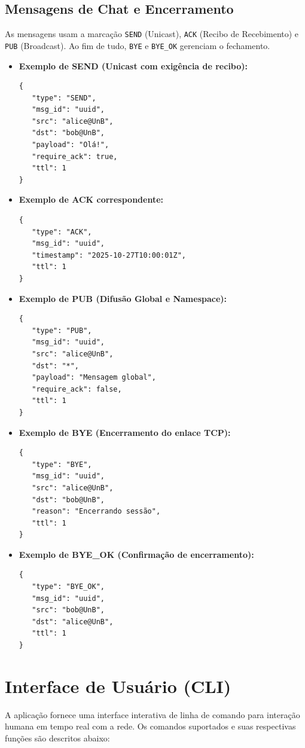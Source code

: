 \documentclass[12pt,a4paper]{article}
\begin{document}
\subsection{Mensagens de Chat e Encerramento}
As mensagens usam a marcação \texttt{SEND} (Unicast), \texttt{ACK} (Recibo de Recebimento) e \texttt{PUB} (Broadcast). Ao fim de tudo, \texttt{BYE} e \texttt{BYE\_OK} gerenciam o fechamento.
\begin{itemize}
    \item \textbf{Exemplo de SEND (Unicast com exigência de recibo):}
\begin{lstlisting}[numbers=none]
{
   "type": "SEND",
   "msg_id": "uuid",
   "src": "alice@UnB",
   "dst": "bob@UnB",
   "payload": "Olá!",
   "require_ack": true,
   "ttl": 1
}
\end{lstlisting}
    \item \textbf{Exemplo de ACK correspondente:}
\begin{lstlisting}[numbers=none]
{
   "type": "ACK",
   "msg_id": "uuid",
   "timestamp": "2025-10-27T10:00:01Z",
   "ttl": 1
}
\end{lstlisting}
    \item \textbf{Exemplo de PUB (Difusão Global e Namespace):}
\begin{lstlisting}[numbers=none]
{
   "type": "PUB",
   "msg_id": "uuid",
   "src": "alice@UnB",
   "dst": "*",
   "payload": "Mensagem global",
   "require_ack": false,
   "ttl": 1
}
\end{lstlisting}
    \item \textbf{Exemplo de BYE (Encerramento do enlace TCP):}
\begin{lstlisting}[numbers=none]
{
   "type": "BYE",
   "msg_id": "uuid",
   "src": "alice@UnB",
   "dst": "bob@UnB",
   "reason": "Encerrando sessão",
   "ttl": 1
}
\end{lstlisting}
    \item \textbf{Exemplo de BYE\_OK (Confirmação de encerramento):}
\begin{lstlisting}[numbers=none]
{
   "type": "BYE_OK",
   "msg_id": "uuid",
   "src": "bob@UnB",
   "dst": "alice@UnB",
   "ttl": 1
}
\end{lstlisting}
\end{itemize}

\section{Interface de Usuário (CLI)}

A aplicação fornece uma interface interativa de linha de comando para interação humana em tempo real com a rede. Os comandos suportados e suas respectivas funções são descritos abaixo:
\end{document}
